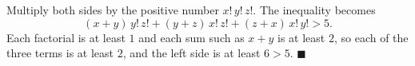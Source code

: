 Multiply both sides by the positive number $x!\,y!\,z!$. The inequality becomes
\[
(x+y)\,y!\,z!+(y+z)\,x!\,z!+(z+x)\,x!\,y!>5 .
\]
Each factorial is at least $1$ and each sum such as $x+y$ is at least $2$, so each of the three terms is at least $2$, and the left side is at least $6>5$. $\blacksquare$
